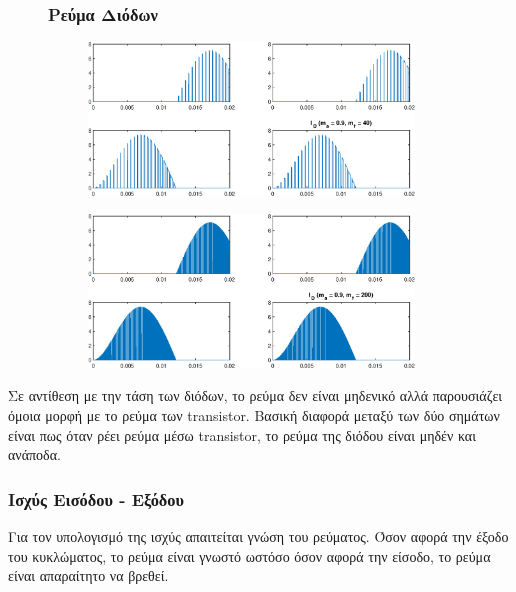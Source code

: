 \begin{figure}[h!]
	\subsubsection*{Ρεύμα Διόδων}
	\begin{subfigure}{0.49\textwidth}
		\centering
		\includegraphics[width=0.95\textwidth]{Images/I_D_40}
	\end{subfigure}
	\begin{subfigure}{0.49\textwidth}
		\centering
		\includegraphics[width=0.95\textwidth]{Images/I_D_200}
	\end{subfigure}
\end{figure}
\noindent
Σε αντίθεση με την τάση των διόδων, το ρεύμα δεν είναι μηδενικό αλλά παρουσιάζει όμοια μορφή με το ρεύμα των transistor. Βασική διαφορά μεταξύ των δύο σημάτων είναι πως όταν ρέει ρεύμα μέσω transistor, το ρεύμα της διόδου είναι μηδέν και ανάποδα.

\subsubsection*{Ισχύς Εισόδου - Εξόδου}
Για τον υπολογισμό της ισχύς απαιτείται γνώση του ρεύματος. Όσον αφορά την έξοδο του κυκλώματος, το ρεύμα είναι γνωστό ωστόσο όσον αφορά την είσοδο, το ρεύμα είναι απαραίτητο να βρεθεί. 

